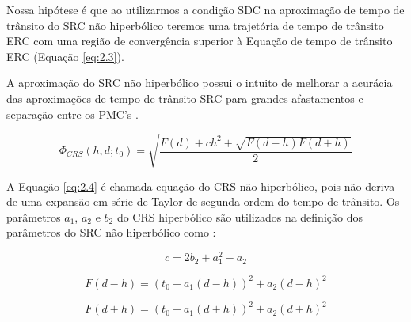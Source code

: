 Nossa hipótese é que ao utilizarmos a condição SDC na aproximação de tempo de trânsito do SRC não hiperbólico
teremos uma trajetória de tempo de trânsito ERC com uma região de convergência superior à Equação de tempo de
trânsito ERC (Equação \ref{eq:2.3}).

A aproximação do SRC não hiperbólico possui o
intuito de melhorar a acurácia das aproximações de tempo de trânsito SRC
para grandes afastamentos e separação entre os PMC's \cite{fomel1}.

\begin{equation}
\label{eq:2.4}
 \Phi_{CRS}(h,d;t_0)=\sqrt{\frac{F(d)+ch^2+\sqrt{F(d-h)F(d+h)}}{2}}
\end{equation}

A Equação \ref{eq:2.4} é chamada equação do CRS não-hiperbólico, pois não deriva de uma expansão em série de Taylor
de segunda ordem do tempo de trânsito. Os parâmetros 
$a_1$, $a_2$ e $b_2$
do CRS hiperbólico são utilizados na definição
dos parâmetros do SRC não hiperbólico como \cite{fomel1}:

\begin{equation}
\label{eq:2.5}
 c=2b_2+a_1^2-a_2
\end{equation}

\begin{equation}
\label{eq:2.6}
 F(d-h)=(t_0+a_1(d-h))^2+a_2(d-h)^2
\end{equation}

\begin{equation}
\label{eq:2.7}
 F(d+h)=(t_0+a_1(d+h))^2+a_2(d+h)^2
\end{equation}